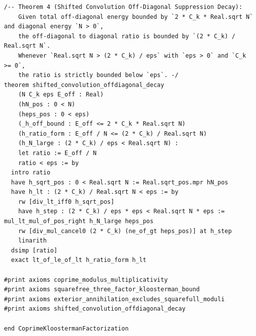 \documentclass[11pt,a4paper]{article}
\begin{document}
\begin{lstlisting}[language=Lean4]
/-- Theorem 4 (Shifted Convolution Off-Diagonal Suppression Decay):
    Given total off-diagonal energy bounded by `2 * C_k * Real.sqrt N` and diagonal energy `N > 0`,
    the off-diagonal to diagonal ratio is bounded by `(2 * C_k) / Real.sqrt N`.
    Whenever `Real.sqrt N > (2 * C_k) / eps` with `eps > 0` and `C_k >= 0`,
    the ratio is strictly bounded below `eps`. -/
theorem shifted_convolution_offdiagonal_decay
    (N C_k eps E_off : Real)
    (hN_pos : 0 < N)
    (heps_pos : 0 < eps)
    (_h_off_bound : E_off <= 2 * C_k * Real.sqrt N)
    (h_ratio_form : E_off / N <= (2 * C_k) / Real.sqrt N)
    (h_N_large : (2 * C_k) / eps < Real.sqrt N) :
    let ratio := E_off / N
    ratio < eps := by
  intro ratio
  have h_sqrt_pos : 0 < Real.sqrt N := Real.sqrt_pos.mpr hN_pos
  have h_lt : (2 * C_k) / Real.sqrt N < eps := by
    rw [div_lt_iff0 h_sqrt_pos]
    have h_step : (2 * C_k) / eps * eps < Real.sqrt N * eps := mul_lt_mul_of_pos_right h_N_large heps_pos
    rw [div_mul_cancel0 (2 * C_k) (ne_of_gt heps_pos)] at h_step
    linarith
  dsimp [ratio]
  exact lt_of_le_of_lt h_ratio_form h_lt

#print axioms coprime_modulus_multiplicativity
#print axioms squarefree_three_factor_kloosterman_bound
#print axioms exterior_annihilation_excludes_squarefull_moduli
#print axioms shifted_convolution_offdiagonal_decay

end CoprimeKloostermanFactorization
\end{lstlisting}
\end{document}
